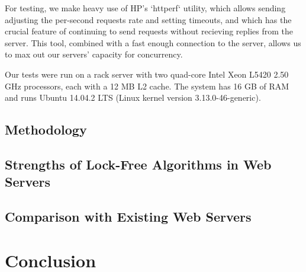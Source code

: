 \documentclass[twoside]{article}
\begin{document}
\begin{multicols}{2}
For testing, we make heavy use of HP's `httperf` utility, which allows
sending adjusting the per-second requests rate and setting timeouts,
and which has the crucial feature of continuing to send requests
without recieving replies from the server. This tool, combined with a
fast enough connection to the server, allows us to max out our
servers' capacity for concurrency.

Our tests were run on a rack server with two quad-core Intel Xeon
L5420 2.50 GHz processors, each with a 12 MB L2 cache. The system has
16 GB of RAM and runs Ubuntu 14.04.2 LTS (Linux kernel version
3.13.0-46-generic).

\subsection{Methodology}
\subsection{Strengths of Lock-Free Algorithms in Web Servers}
\subsection{Comparison with Existing Web Servers}
\section{Conclusion}

\end{multicols}

{\small
  
  
}
\end{document}

